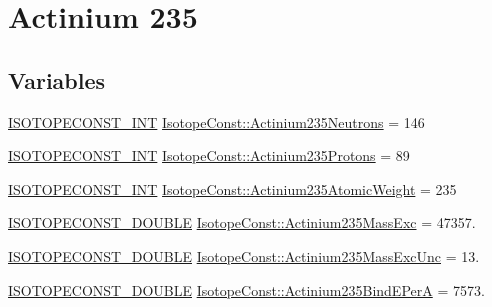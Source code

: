 \hypertarget{group___isotope_const-_actinium-_ac235}{}\section{Actinium 235}
\label{group___isotope_const-_actinium-_ac235}
\subsection*{Variables}
\begin{DoxyCompactItemize}
\item 
\mbox{\hyperlink{group___isotope_const-_macros_ga5f18360b3e99483a35c32d789e62621c}{I\+S\+O\+T\+O\+P\+E\+C\+O\+N\+S\+T\+\_\+\+I\+NT}} \mbox{\hyperlink{group___isotope_const-_actinium-_ac235_gaaca2b20fcd6f0236dd508ffadb010d63}{Isotope\+Const\+::\+Actinium235\+Neutrons}} = 146
\item 
\mbox{\hyperlink{group___isotope_const-_macros_ga5f18360b3e99483a35c32d789e62621c}{I\+S\+O\+T\+O\+P\+E\+C\+O\+N\+S\+T\+\_\+\+I\+NT}} \mbox{\hyperlink{group___isotope_const-_actinium-_ac235_gaae6ae0de10c6becc05f5e88076d6c219}{Isotope\+Const\+::\+Actinium235\+Protons}} = 89
\item 
\mbox{\hyperlink{group___isotope_const-_macros_ga5f18360b3e99483a35c32d789e62621c}{I\+S\+O\+T\+O\+P\+E\+C\+O\+N\+S\+T\+\_\+\+I\+NT}} \mbox{\hyperlink{group___isotope_const-_actinium-_ac235_gadaa1b3757b6ea2b8639cb4759de93412}{Isotope\+Const\+::\+Actinium235\+Atomic\+Weight}} = 235
\item 
\mbox{\hyperlink{group___isotope_const-_macros_ga8f45a7272ce02c0b4c65c44636ed719a}{I\+S\+O\+T\+O\+P\+E\+C\+O\+N\+S\+T\+\_\+\+D\+O\+U\+B\+LE}} \mbox{\hyperlink{group___isotope_const-_actinium-_ac235_gab0cd839151553d37b3a210c8c1a926b2}{Isotope\+Const\+::\+Actinium235\+Mass\+Exc}} = 47357.
\item 
\mbox{\hyperlink{group___isotope_const-_macros_ga8f45a7272ce02c0b4c65c44636ed719a}{I\+S\+O\+T\+O\+P\+E\+C\+O\+N\+S\+T\+\_\+\+D\+O\+U\+B\+LE}} \mbox{\hyperlink{group___isotope_const-_actinium-_ac235_gae6033964ad532dd6ceac8262eb935478}{Isotope\+Const\+::\+Actinium235\+Mass\+Exc\+Unc}} = 13.
\item 
\mbox{\hyperlink{group___isotope_const-_macros_ga8f45a7272ce02c0b4c65c44636ed719a}{I\+S\+O\+T\+O\+P\+E\+C\+O\+N\+S\+T\+\_\+\+D\+O\+U\+B\+LE}} \mbox{\hyperlink{group___isotope_const-_actinium-_ac235_ga4aa82ed5cb7fe8365f1af2b7ae34ec2e}{Isotope\+Const\+::\+Actinium235\+Bind\+E\+PerA}} = 7573.
\item 

\end{DoxyCompactItemize}
